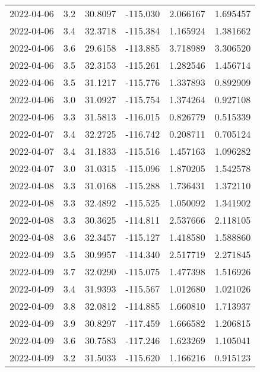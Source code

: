 \begin{tabular}{lrrrrr}
2022-04-06 &       3.2 &  30.8097 &  -115.030 &         2.066167 &         1.695457 \\
2022-04-06 &       3.4 &  32.3718 &  -115.384 &         1.165924 &         1.381662 \\
2022-04-06 &       3.6 &  29.6158 &  -113.885 &         3.718989 &         3.306520 \\
2022-04-06 &       3.5 &  32.3153 &  -115.261 &         1.282546 &         1.456714 \\
2022-04-06 &       3.5 &  31.1217 &  -115.776 &         1.337893 &         0.892909 \\
2022-04-06 &       3.0 &  31.0927 &  -115.754 &         1.374264 &         0.927108 \\
2022-04-06 &       3.3 &  31.5813 &  -116.015 &         0.826779 &         0.515339 \\
2022-04-07 &       3.4 &  32.2725 &  -116.742 &         0.208711 &         0.705124 \\
2022-04-07 &       3.4 &  31.1833 &  -115.516 &         1.457163 &         1.096282 \\
2022-04-07 &       3.0 &  31.0315 &  -115.096 &         1.870205 &         1.542578 \\
2022-04-08 &       3.3 &  31.0168 &  -115.288 &         1.736431 &         1.372110 \\
2022-04-08 &       3.3 &  32.4892 &  -115.525 &         1.050092 &         1.341902 \\
2022-04-08 &       3.3 &  30.3625 &  -114.811 &         2.537666 &         2.118105 \\
2022-04-08 &       3.6 &  32.3457 &  -115.127 &         1.418580 &         1.588860 \\
2022-04-09 &       3.5 &  30.9957 &  -114.340 &         2.517719 &         2.271845 \\
2022-04-09 &       3.7 &  32.0290 &  -115.075 &         1.477398 &         1.516926 \\
2022-04-09 &       3.4 &  31.9393 &  -115.567 &         1.012680 &         1.021026 \\
2022-04-09 &       3.8 &  32.0812 &  -114.885 &         1.660810 &         1.713937 \\
2022-04-09 &       3.9 &  30.8297 &  -117.459 &         1.666582 &         1.206815 \\
2022-04-09 &       3.6 &  30.7583 &  -117.246 &         1.623269 &         1.105041 \\
2022-04-09 &       3.2 &  31.5033 &  -115.620 &         1.166216 &         0.915123 \\

\end{tabular}

